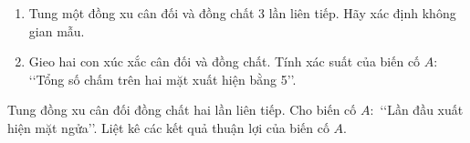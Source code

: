 \begin{bt}%
	\begin{enumerate}
		\item Tung một đồng xu cân đối và đồng chất 3 lần liên tiếp. Hãy xác định không gian mẫu.
		\item Gieo hai con xúc xắc cân đối và đồng chất. Tính xác suất của biến cố $A$: \lq\lq Tổng số chấm trên hai mặt xuất hiện bằng 5\rq\rq.
	\end{enumerate}
\end{bt}

\begin{bt}%
Tung đồng xu cân đối đồng chất hai lần liên tiếp. Cho biến cố $A\colon $   \lq\lq Lần đầu xuất hiện mặt ngửa\rq\rq. Liệt kê các kết quả thuận lợi của biến cố $A$.
\end{bt}

